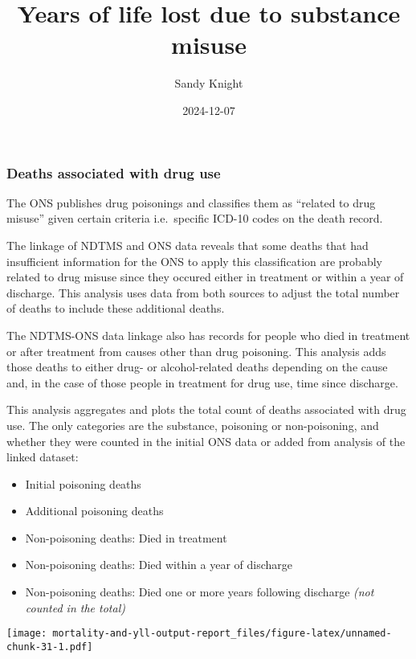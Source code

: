 \documentclass[
]{article}
\title{Years of life lost due to substance misuse}
\author{Sandy Knight}
\date{2024-12-07}
\providecommand{\tightlist}{%
  \setlength{\itemsep}{0pt}\setlength{\parskip}{0pt}}
\begin{document}
\maketitle

{
\setcounter{tocdepth}{2}
\tableofcontents
}
\hypertarget{deaths-associated-with-drug-use}{%
\subsubsection{Deaths associated with drug
use}\label{deaths-associated-with-drug-use}}

The ONS publishes drug poisonings and classifies them as ``related to
drug misuse'' given certain criteria i.e.~specific ICD-10 codes on the
death record.

The linkage of NDTMS and ONS data reveals that some deaths that had
insufficient information for the ONS to apply this classification are
probably related to drug misuse since they occured either in treatment
or within a year of discharge. This analysis uses data from both sources
to adjust the total number of deaths to include these additional deaths.

The NDTMS-ONS data linkage also has records for people who died in
treatment or after treatment from causes other than drug poisoning. This
analysis adds those deaths to either drug- or alcohol-related deaths
depending on the cause and, in the case of those people in treatment for
drug use, time since discharge.

This analysis aggregates and plots the total count of deaths associated
with drug use. The only categories are the substance, poisoning or
non-poisoning, and whether they were counted in the initial ONS data or
added from analysis of the linked dataset:

\begin{itemize}
\tightlist
\item
  Initial poisoning deaths
\item
  Additional poisoning deaths
\item
  Non-poisoning deaths: Died in treatment
\item
  Non-poisoning deaths: Died within a year of discharge
\item
  Non-poisoning deaths: Died one or more years following discharge
  \emph{(not counted in the total)}
\end{itemize}

\texttt{[image: mortality-and-yll-output-report\_files/figure-latex/unnamed-chunk-31-1.pdf]}
\end{document}
